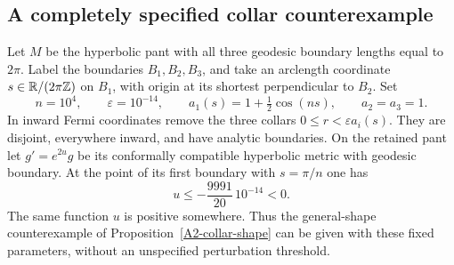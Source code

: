 \subsection{A completely specified collar counterexample}

\begin{proposition}\label{A2-collar-explicit}
Let $M$ be the hyperbolic pant with all three geodesic boundary lengths equal to $2\pi$. Label the boundaries $B_1,B_2,B_3$, and take an arclength coordinate $s\in{\ensuremath{\mathbb{R}}}/(2\pi{\ensuremath{\mathbb{Z}}})$ on $B_1$, with origin at its shortest perpendicular to $B_2$. Set
\[
 n=10^4,\qquad \varepsilon=10^{-14},\qquad
 a_1(s)=1+\tfrac12\cos(ns),\qquad a_2=a_3=1.
\]
In inward Fermi coordinates remove the three collars $0\le r<\varepsilon a_i(s)$. They are disjoint, everywhere inward, and have analytic boundaries. On the retained pant let $g'=e^{2u}g$ be its conformally compatible hyperbolic metric with geodesic boundary. At the point of its first boundary with $s=\pi/n$ one has
\[
 u\le-\frac{9991}{20}\,10^{-14}<0.
\]
The same function $u$ is positive somewhere. Thus the general-shape counterexample of Proposition~\ref{A2-collar-shape} can be given with these fixed parameters, without an unspecified perturbation threshold.
\end{proposition}

